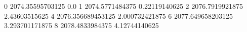 0 2074.35595703125 0.0
1 2074.5771484375 0.22119140625
2 2076.7919921875 2.43603515625
4 2076.356689453125 2.000732421875
6 2077.649658203125 3.293701171875
8 2078.4833984375 4.12744140625
